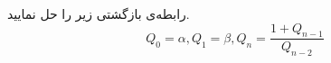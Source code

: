 \EXERCISE
رابطه‌ی بازگشتی زیر را حل نمایید.
$$Q_0 = \alpha, Q_1 = \beta, Q_n = \frac{1 + Q_{n-1}}{Q_{n-2}}$$